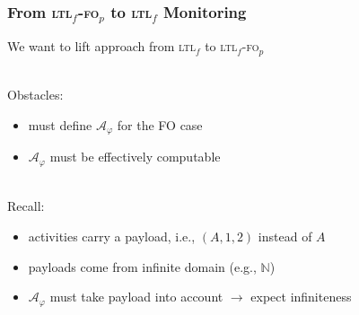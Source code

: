 \documentclass[xcolor=dvipsnames]{beamer}
\newcommand{\A}{\mathcal A\xspace}
\newcommand{\ltlf}{\textsc{ltl}$_f$\xspace}
\newcommand{\ltlffop}{\ltlf-\textsc{fo}$_p$\xspace}
\begin{document}
\begin{frame}
\frametitle{From \ltlffop to \ltlf Monitoring}

We want to lift approach from \ltlf to \ltlffop

~\\

Obstacles: 
\begin{itemize}
	\item must define $\A_\varphi$ for the FO case
	\item $\A_\varphi$ must be effectively computable
\end{itemize}

~\\

Recall: 
\begin{itemize}
	\item activities carry a payload, i.e., $(A,1,2)$ instead of $A$
	\item payloads come from infinite domain (e.g., $\mathbb{N}$)
	\item $\A_\varphi$ must take payload into account ${}\rightarrow{}$ expect infiniteness
\end{itemize}
\end{frame}

\end{document}
